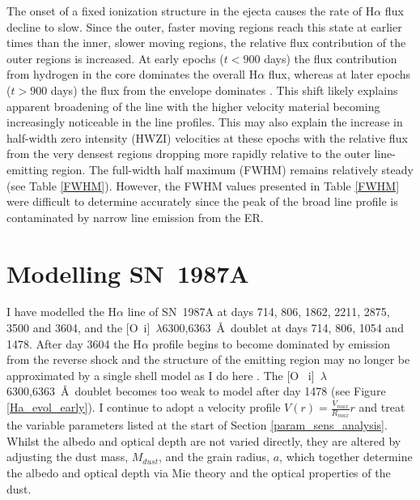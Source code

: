 The onset of a fixed ionization structure in the ejecta causes the rate of 
H$\alpha$ flux decline to slow.  Since the outer, faster moving regions 
reach this state at earlier times than the inner, slower moving regions, 
the relative flux contribution of the outer regions is increased.  At 
early epochs ($t<900$ days) the flux contribution from hydrogen in the 
core dominates the overall H$\alpha$ flux, whereas at later epochs ($t > 
900$ days) the flux from the envelope dominates \citep{Fransson1993, 
Kozma1998a}.  This shift likely explains apparent broadening of the line 
with the higher velocity material becoming increasingly noticeable in the 
line profiles.  This may also explain the increase in half-width zero intensity (HWZI) velocities at 
these epochs with the relative flux from the very densest regions dropping 
more rapidly relative to the outer line-emitting region. The full-width 
half maximum (FWHM) remains relatively steady (see Table 
\ref{FWHM}). However, the FWHM values presented in Table \ref{FWHM} were difficult 
to determine accurately since the peak of the broad line profile is 
contaminated by narrow line emission from the ER.


\section{Modelling SN~1987A}
\label{results}





I have modelled the H$\alpha$ line of SN~1987A at days 714, 806, 1862, 
2211, 2875, 3500 and 3604, and the [O~{\sc i}]~$\lambda$6300,6363~\AA\ 
doublet at days 714, 806, 1054 and 1478.  After day 3604 the H$\alpha$ 
profile begins to become dominated by emission from the reverse shock and 
the structure of the emitting region may no longer be approximated by a 
single shell model as I do here \citep{Fransson2013}.  The [O~{\sc 
i}]~$\lambda$6300,6363~\AA\ doublet becomes too weak to model after day 
1478 (see Figure \ref{Ha_evol_early}).  I continue to adopt a velocity 
profile $V(r) = \frac{V_{max}}{R_{max}}r$ and treat the variable 
parameters listed at the start of Section \ref{param_sens_analysis}.  Whilst the albedo and 
optical depth are not varied directly, they are altered by adjusting the 
dust mass, $M_{dust}$, and the grain radius, $a$, which together determine 
the albedo and optical depth via Mie theory and the optical properties of 
the dust.

